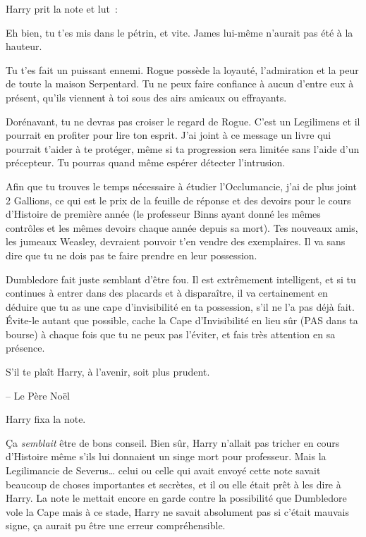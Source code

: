 Harry prit la note et lut~:


\begin{writtenNote}
Eh bien, tu t'es mis dans le pétrin, et vite.
James lui-même n'aurait pas été à la hauteur.

Tu t'es fait un puissant ennemi.
Rogue possède la loyauté, l'admiration et la peur de toute la maison Serpentard.
Tu ne peux faire confiance à aucun d'entre eux à présent, qu'ils viennent à toi sous des airs amicaux ou effrayants.

Dorénavant, tu ne devras pas croiser le regard de Rogue.
C'est un Legilimens et il pourrait en profiter pour lire ton esprit.
J'ai joint à ce message un livre qui pourrait t'aider à te protéger, même si ta progression sera limitée sans l'aide d'un précepteur.
Tu pourras quand même espérer détecter l'intrusion.

Afin que tu trouves le temps nécessaire à étudier l'Occlumancie, j'ai de plus joint 2 Gallions, ce qui est le prix de la feuille de réponse et des devoirs pour le cours d'Histoire de première année (le professeur Binns ayant donné les mêmes contrôles et les mêmes devoirs chaque année depuis sa mort).
Tes nouveaux amis, les jumeaux Weasley, devraient pouvoir t'en vendre des exemplaires.
Il va sans dire que tu ne dois pas te faire prendre en leur possession.

Dumbledore fait juste semblant d'être fou.
Il est extrêmement intelligent, et si tu continues à entrer dans des placards et à disparaître, il va certainement en déduire que tu as une cape d'invisibilité en ta possession, s'il ne l'a pas déjà fait.
Évite-le autant que possible, cache la Cape d'Invisibilité en lieu sûr (PAS dans ta bourse) à chaque fois que tu ne peux pas l'éviter, et fais très attention en sa présence.

S'il te plaît Harry, à l'avenir, soit plus prudent.

-- Le Père Noël
\end{writtenNote}

Harry fixa la note.

Ça \emph{semblait} être de bons conseil.
Bien sûr, Harry n'allait pas tricher en cours d'Histoire même s'ils lui donnaient un singe mort pour professeur.
Mais la Legilimancie de Severus… celui ou celle qui avait envoyé cette note savait beaucoup de choses importantes et secrètes, et il ou elle était prêt à les dire à Harry.
La note le mettait encore en garde contre la possibilité que Dumbledore vole la Cape mais à ce stade, Harry ne savait absolument pas si c'était mauvais signe, ça aurait pu être une erreur compréhensible.

